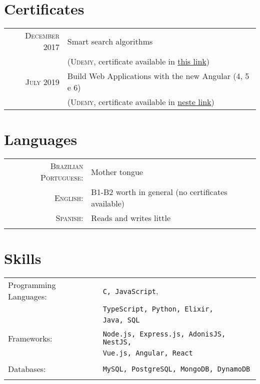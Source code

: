 \documentclass[a4paper,10pt]{article}
\begin{document}
\section{Certificates}
\begin{tabular}{rl}
\textsc{December} 2017 & Smart search algorithms\\ & (\textsc{Udemy}, \footnotesize{certificate available in \href{https://www.udemy.com/certificate/UC-9414I0UR/}{this link}})\\
\textsc{July} 2019 &  Build Web Applications with the new Angular (4, 5 e 6)\\ & (\textsc{Udemy}, \footnotesize{certificate available in \href{https://www.udemy.com/certificate/UC-P6VGWTET/}{neste link}})
\end{tabular}

\section{Languages}
\begin{tabular}{rl}
 \textsc{Brazilian Portuguese:}& Mother tongue\\
\textsc{English:}&B1-B2 worth in general (no certificates available)\\
\textsc{Spanish:}&Reads and writes little\\\\
\end{tabular}

\section{Skills}
\begin{tabular}{ll}
  Programming Languages: &\texttt{C, JavaScript},\\
                         &\texttt{TypeScript, Python, Elixir,}\\
                         &\texttt{Java, SQL}\\\\
  Frameworks: &\texttt{Node.js, Express.js, AdonisJS, NestJS,}\\
              &\texttt{Vue.js, Angular, React}\\\\
  Databases: &\texttt{MySQL, PostgreSQL, MongoDB, DynamoDB}\\\\
\end{tabular}
\end{document}
